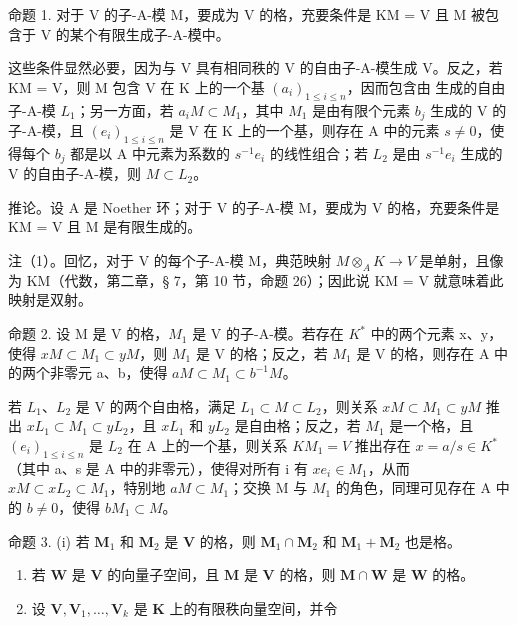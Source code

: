 命题 1. 对于 V 的子-A-模 M，要成为 V 的格，充要条件是 KM = V 且 M 被包含于 V 的某个有限生成子-A-模中。

这些条件显然必要，因为与 V 具有相同秩的 V 的自由子-A-模生成 V。反之，若 KM = V，则 M 包含 V 在 K 上的一个基 \((a_{i})_{1 \leqslant i \leqslant n}\)，因而包含由  生成的自由子-A-模 \(L_{1}\)；另一方面，若 \(a_{i}\)\(M \subset M_{1}\)，其中 \(M_{1}\) 是由有限个元素 \(b_{j}\) 生成的 V 的子-A-模，且 \((e_{i})_{1 \leqslant i \leqslant n}\) 是 V 在 K 上的一个基，则存在 A 中的元素 \(s \neq 0\)，使得每个 \(b_{j}\) 都是以 A 中元素为系数的 \(s^{-1}e_{i}\) 的线性组合；若 \(L_{2}\) 是由 \(s^{-1}e_{i}\) 生成的 V 的自由子-A-模，则 \(M \subset L_{2}\)。

推论。设 A 是 Noether 环；对于 V 的子-A-模 M，要成为 V 的格，充要条件是 KM = V 且 M 是有限生成的。

注（1）。回忆，对于 V 的每个子-A-模 M，典范映射 \(M \otimes_{A} K \to V\) 是单射，且像为 KM（代数，第二章，§ 7，第 10 节，命题 26）；因此说 KM = V 就意味着此映射是双射。

命题 2. 设 M 是 V 的格，\(M_{1}\) 是 V 的子-A-模。若存在 \(K^{*}\) 中的两个元素 x、y，使得 \(xM \subset M_{1} \subset yM\)，则 \(M_{1}\) 是 V 的格；反之，若 \(M_{1}\) 是 V 的格，则存在 A 中的两个非零元 a、b，使得 \(aM \subset M_{1} \subset b^{-1}M\)。

若 \(L_{1}\)、\(L_{2}\) 是 V 的两个自由格，满足 \(L_{1} \subset M \subset L_{2}\)，则关系 \(xM \subset M_{1} \subset yM\) 推出 \(xL_{1} \subset M_{1} \subset yL_{2}\)，且 \(xL_{1}\) 和 \(yL_{2}\) 是自由格；反之，若 \(M_{1}\) 是一个格，且 \((e_{i})_{1 \leqslant i \leqslant n}\) 是 \(L_{2}\) 在 A 上的一个基，则关系 \(KM_{1} = V\) 推出存在 \(x = a/s \in K^{*}\)（其中 a、s 是 A 中的非零元），使得对所有 i 有 \(xe_{i} \in M_{1}\)，从而 \(xM \subset xL_{2} \subset M_{1}\)，特别地 \(aM \subset M_{1}\)；交换 M 与 \(M_{1}\) 的角色，同理可见存在 A 中的 \(b \neq 0\)，使得 \(bM_{1} \subset M\)。

命题 3. (i) 若 \(\mathbf{M}_1\) 和 \(\mathbf{M}_2\) 是 \(\mathbf{V}\) 的格，则 \(\mathbf{M}_1 \cap \mathbf{M}_2\) 和 \(\mathbf{M}_1 + \mathbf{M}_2\) 也是格。

\begin{enumerate}
\def\labelenumi{(\roman{enumi})}
\setcounter{enumi}{1}
\item
  若 \(\mathbf{W}\) 是 \(\mathbf{V}\) 的向量子空间，且 \(\mathbf{M}\) 是 \(\mathbf{V}\) 的格，则 \(\mathbf{M} \cap \mathbf{W}\) 是 \(\mathbf{W}\) 的格。
\item
  设 \(\mathbf{V},\mathbf{V}_1,\ldots ,\mathbf{V}_k\) 是 \(\mathbf{K}\) 上的有限秩向量空间，并令
\end{enumerate}

